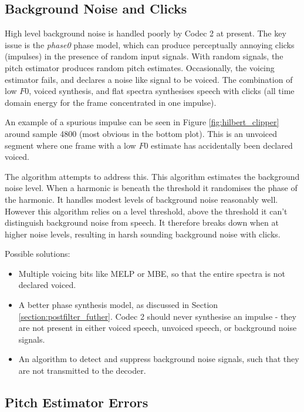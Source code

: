 \documentclass{article}
\begin{document}
\subsection{Background Noise and Clicks}
\label{section:clicks}

High level background noise is handled poorly by Codec 2 at present.  The key issue is the \emph{phase0} phase model, which can produce perceptually annoying clicks (impulses) in the presence of random input signals.  With random signals, the pitch estimator produces random pitch estimates.  Occasionally, the voicing estimator fails, and declares a noise like signal to be voiced.  The combination of low $F0$, voiced synthesis, and flat spectra synthesises speech with clicks (all time domain energy for the frame concentrated in one impulse).

An example of a spurious impulse can be seen in Figure \ref{fig:hilbert_clipper} around sample 4800 (most obvious in the bottom plot).  This is an unvoiced segment where one frame with a low $F0$ estimate has accidentally been declared voiced.

The  algorithm attempts to address this.  This algorithm estimates the background noise level.  When a harmonic is beneath the threshold it randomises the phase of the harmonic. It handles modest levels of background noise reasonably well.  However this algorithm relies on a level threshold, above the threshold it can't distinguish background noise from speech. It therefore breaks down when at higher noise levels, resulting in harsh sounding background noise with clicks.

Possible solutions:
\begin{itemize}
\item Multiple voicing bits like MELP or MBE, so that the entire spectra is not declared voiced.
\item A better phase synthesis model, as discussed in Section \ref{section:postfilter_futher}.  Codec 2 should never synthesise an impulse - they are not present in either voiced speech, unvoiced speech, or background noise signals.
\item An algorithm to detect and suppress background noise signals, such that they are not transmitted to the decoder.
\end{itemize}

\subsection{Pitch Estimator Errors}
\end{document}
